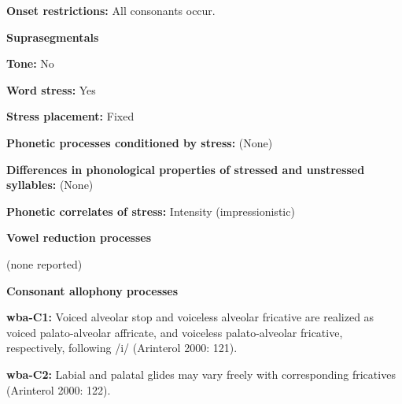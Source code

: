 \begin{styleBody}
\textbf{Onset restrictions:} All consonants occur.
\end{styleBody}

\begin{styleBody}
\textbf{Suprasegmentals}
\end{styleBody}

\begin{styleBody}
\textbf{Tone:} No
\end{styleBody}

\begin{styleBody}
\textbf{Word stress:} Yes
\end{styleBody}

\begin{styleBody}
\textbf{Stress placement:} Fixed
\end{styleBody}

\begin{styleBody}
\textbf{Phonetic processes conditioned by stress:} (None)
\end{styleBody}

\begin{styleBody}
\textbf{Differences in phonological properties of stressed and unstressed syllables:} (None)
\end{styleBody}

\begin{styleBody}
\textbf{Phonetic correlates of stress: }Intensity (impressionistic)
\end{styleBody}

\begin{styleBody}
\textbf{Vowel reduction processes}
\end{styleBody}

\begin{styleBody}
(none reported)
\end{styleBody}

\begin{styleBody}
\textbf{Consonant allophony processes}
\end{styleBody}

\begin{styleBody}
\textbf{wba-C1: }Voiced alveolar stop and voiceless alveolar fricative are realized as voiced palato-alveolar affricate, and voiceless palato-alveolar fricative, respectively, following /i/ (Arinterol 2000: 121).
\end{styleBody}

\begin{styleBody}
\textbf{wba-C2: }Labial and palatal glides may vary freely with corresponding fricatives (Arinterol 2000: 122).
\end{styleBody}

